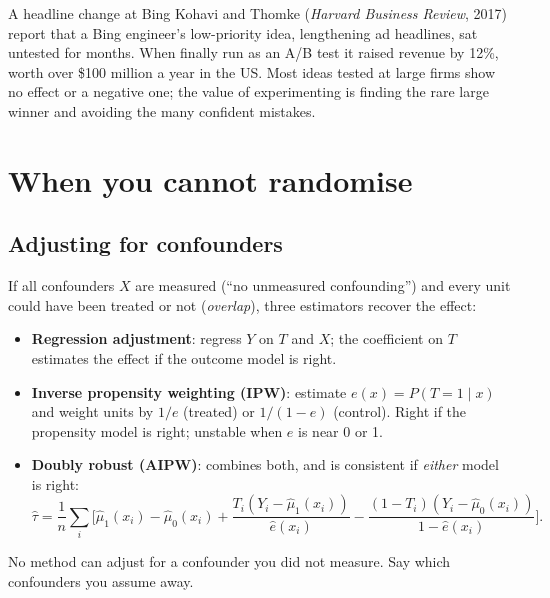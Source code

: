 \begin{realcase}{A headline change at Bing}
Kohavi and Thomke (\emph{Harvard Business Review}, 2017) report that a Bing engineer's low-priority idea, lengthening
ad headlines, sat untested for months. When finally run as an A/B test it raised revenue by 12\%, worth over \$100
million a year in the US. Most ideas tested at large firms show no effect or a negative one; the value of
experimenting is finding the rare large winner and avoiding the many confident mistakes.
\end{realcase}

\section{When you cannot randomise}
\subsection{Adjusting for confounders}
If all confounders $X$ are measured (``no unmeasured confounding'') and every unit could have been treated or not
(\emph{overlap}), three estimators recover the effect:
\begin{itemize}[nosep]
\item \textbf{Regression adjustment}: regress $Y$ on $T$ and $X$; the coefficient on $T$ estimates the effect if the
outcome model is right.
\item \textbf{Inverse propensity weighting (IPW)}: estimate $e(x)=P(T{=}1\mid x)$ and weight units by $1/e$ (treated)
or $1/(1-e)$ (control). Right if the propensity model is right; unstable when $e$ is near 0 or 1.
\item \textbf{Doubly robust (AIPW)}: combines both, and is consistent if \emph{either} model is right:
\[ \hat\tau=\frac1n\sum_i\Big[\hat\mu_1(x_i)-\hat\mu_0(x_i)+\frac{T_i(Y_i-\hat\mu_1(x_i))}{\hat e(x_i)}-\frac{(1-T_i)(Y_i-\hat\mu_0(x_i))}{1-\hat e(x_i)}\Big]. \]
\end{itemize}
No method can adjust for a confounder you did not measure. Say which confounders you assume away.

